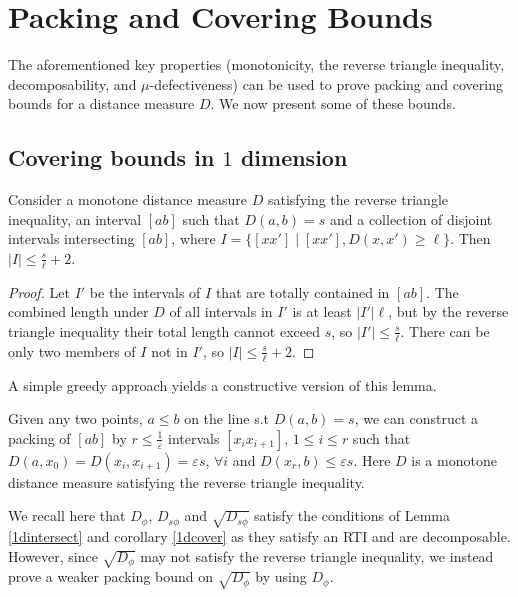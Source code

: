 \documentclass[11pt]{myclass}
\newcommand{\breg}{\ensuremath{D_\phi}}
\newcommand{\sbreg}{\ensuremath{D_{s\phi}}}
\newcommand{\eps}{\varepsilon}
\begin{document}
\section{Packing and Covering Bounds}
\label{covering}
The aforementioned key properties (monotonicity, the reverse triangle inequality, decomposability, and $\mu$-defectiveness) can be 
used to prove packing and covering bounds for a distance measure $D$. We now present some of these bounds. 

\subsection{Covering bounds in $1$ dimension}
\begin{lemma}\label{1dintersect}
Consider a monotone distance measure $D$ satisfying the reverse triangle inequality, an interval $[ab]$ such that $D(a,b) = s$ and a
 collection of disjoint intervals intersecting $[ab]$, where $I = \{[x x'] \mid [x x'] , D(x, x') \geq \ell\}$. Then  $|I| \leq \frac{s}{\ell}+2$.
\end{lemma}

\begin{proof}
 Let $I'$ be the intervals of $I$ that are totally contained in $[ab]$. 
 The combined length under $D$ of all intervals in $I'$ is at least $|I'|\ell$, but by the reverse triangle inequality their total length cannot exceed $s$, so $|I'| \leq \frac{s}{\ell}$. 
 There can be only two members of $I$ not in $I'$, so  $|I| \leq \frac{s}{\ell} + 2$.
 \end{proof}  

A simple greedy approach yields a constructive version of this lemma. 
\begin{corollary}\label{1dcover}
Given any two points, $a \leq b$ on the line s.t $D(a,b) = s$, we can construct a packing of $[ab]$ by $r \le \frac{1}{\eps}$ intervals $[x_i x_{i+1}]$, $1 \leq i \leq r$ such that $D(a, x_0) = D(x_i, x_{i+1}) = \eps s$, $\forall i$ and $D(x_r , b) \leq \eps s$. Here $D$ is a monotone distance measure satisfying the reverse triangle inequality.
\end{corollary}

We recall here that $\breg$, $\sbreg$ and $\sqrt{\sbreg}$ satisfy the conditions of Lemma \ref{1dintersect} and corollary \ref{1dcover} as they satisfy
an RTI and are decomposable.  However, since $\sqrt{\breg}$  may not satisfy the reverse triangle inequality, we instead prove a weaker 
packing bound on $\sqrt{\breg}$ by using $\breg$.
\end{document}
